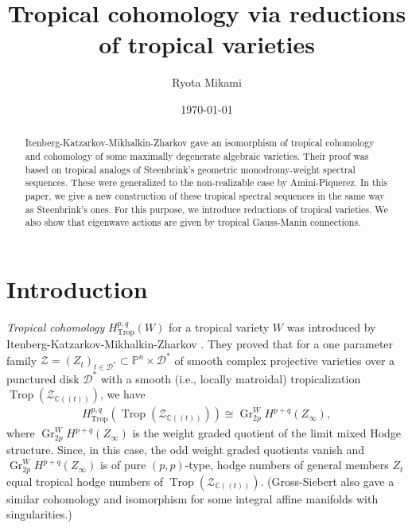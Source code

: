 \documentclass[12pt,a4]{amsart}
\def\P{\mathbb{P}}
\def\Gr{\mathop{\mathrm{Gr}}\nolimits}
\def\Trop{\mathop{\mathrm{trop}}\nolimits}
\def\Trop{\mathop{\mathrm{Trop}}\nolimits}
\def\Gr{\mathop{\mathrm{Gr}}\nolimits}
\numberwithin{equation}{section}
\numberwithin{figure}{section}
\begin{document}
 \title[Tropical cohomology via reductions]{Tropical cohomology via reductions of tropical varieties}
 \author{Ryota Mikami}
 \address{Institute of Mathematics, Academia Sinica, Astronomy-Mathematics Building, No.\ 1, Sec.\ 4, Roosevelt Road, Taipei 10617, Taiwan.}
 \date{\today}
 
\begin{abstract}
  Itenberg-Katzarkov-Mikhalkin-Zharkov 
  gave an isomorphism of tropical cohomology and cohomology of some maximally degenerate algebraic varieties.
  Their proof was based on tropical analogs of Steenbrink's geometric monodromy-weight spectral sequences.
  These were generalized to the non-realizable case
  by  
  Amini-Piquerez.  
    In this paper, we give a new construction of these tropical spectral sequences in the same way as Steenbrink's ones. 
  For this purpose, we introduce 
    reductions of tropical varieties. 
  We also show that eigenwave actions are given by 
   tropical Gauss-Manin connections.
 \end{abstract}
 
 \maketitle
 \setcounter{tocdepth}{1}
 \tableofcontents
 

\section{Introduction}\label{sec:introduction}
  \emph{Tropical cohomology} $H^{p,q}_{\Trop} (W)$ for a tropical variety $W$ 
   was introduced by 
   Itenberg-Katzarkov-Mikhalkin-Zharkov \cite{ItenbergKatzarkovMikhalkinZharkovTropicalhomology2019}. 
   They proved that for a one parameter 
   family 
   $\mathcal{Z} = (Z_t)_{t \in \mathcal{D}^*} \subset \P^n \times \mathcal{D}^{*}$ 
   of smooth complex projective varieties 
   over a punctured disk $\mathcal{D}^*$
   with a smooth (i.e., locally matroidal) tropicalization $\Trop (\mathcal{Z}_{\mathbb{C} ((t))})$, 
   we have 
   \begin{align}\label{eq tro coh = LMHS}
   H^{p,q}_{\Trop}(\Trop (\mathcal{Z}_{\mathbb{C} ((t))}))
   \cong 
   \Gr_{2p}^W H^{p+q} (Z_{\infty}),
   \end{align}
   where $\Gr_{2p}^W H^{p+q} (Z_{\infty})$ is
   the weight graded quotient
   of the limit mixed Hodge structure.
   Since, in this case,   
   the odd weight graded quotients vanish 
   and $\Gr_{2p}^W H^{p+q} (Z_{\infty})$ is of pure $(p,p)$-type, 
   hodge numbers of general members $Z_t$
   equal tropical hodge numbers of $
    \Trop(\mathcal{Z}_{\mathbb{C}((t))})$.
   (Gross-Siebert \cite{GrossSiebertMirrorsymmetryvialogarithmicdegenerationdataII2010} also gave a similar cohomology and isomorphism for some integral affine manifolds with singularities.)
   
\end{document}
